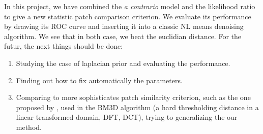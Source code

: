 \documentclass[runningheads]{llncs}
\begin{document}
In this project, we have combined the \textit{a contrario} model and the likelihood ratio to give a new statistic patch comparison criterion. We evaluate its performance by drawing its ROC curve and inserting it into a classic NL means denoising algorithm. We see that in both case, we beat the euclidian distance. For the futur, the next things should be done:
\begin{enumerate}
 \item Studying the case of laplacian prior and evaluating the performance.
 \item Finding out how to fix automatically the parameters.
 \item Comparing to more sophisticates patch similarity criterion, such as the one proposed by \cite{Dabov:2006}, used in the BM3D algorithm (a hard thresholding distance in a linear transformed domain, DFT, DCT), trying to generalizing the our method. 
\end{enumerate}

\newpage



\end{document}

